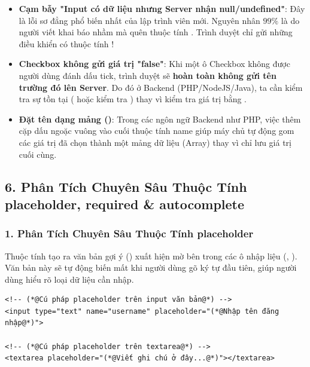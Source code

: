 \begin{tipBox}
\begin{itemize}[leftmargin=1.5em, itemsep=4pt, parsep=0pt]
    \item \textbf{Cạm bẫy "Input có dữ liệu nhưng Server nhận null/undefined"}: Đây là lỗi sơ đẳng phổ biến nhất của lập trình viên mới. Nguyên nhân $99\%$ là do người viết khai báo nhầm  mà quên thuộc tính . Trình duyệt chỉ gửi những điều khiển có thuộc tính !
    \item \textbf{Checkbox không gửi giá trị "false"}: Khi một ô Checkbox không được người dùng đánh dấu tick, trình duyệt sẽ \textbf{hoàn toàn không gửi tên trường đó lên Server}. Do đó ở Backend (PHP/NodeJS/Java), ta cần kiểm tra sự tồn tại ( hoặc kiểm tra ) thay vì kiểm tra giá trị bằng .
    \item \textbf{Đặt tên dạng mảng ()}: Trong các ngôn ngữ Backend như PHP, việc thêm cặp dấu ngoặc vuông \codeinline{[]} vào cuối thuộc tính name giúp máy chủ tự động gom các giá trị đã chọn thành một mảng dữ liệu (Array) thay vì chỉ lưu giá trị cuối cùng.
\end{itemize}
\end{tipBox}
\subsection{6. Phân Tích Chuyên Sâu Thuộc Tính placeholder, required \& autocomplete}

\subsubsection{1. Phân Tích Chuyên Sâu Thuộc Tính placeholder}

\begin{conceptBox}
Thuộc tính  tạo ra văn bản gợi ý () xuất hiện mờ bên trong các ô nhập liệu (, ). Văn bản này sẽ tự động biến mất khi người dùng gõ ký tự đầu tiên, giúp người dùng hiểu rõ loại dữ liệu cần nhập.
\end{conceptBox}

\begin{codeWindow}
\begin{lstlisting}[language=HTML5]
<!-- (*@Cú pháp placeholder trên input văn bản@*) -->
<input type="text" name="username" placeholder="(*@Nhập tên đăng nhập@*)">

<!-- (*@Cú pháp placeholder trên textarea@*) -->
<textarea placeholder="(*@Viết ghi chú ở đây...@*)"></textarea>
\end{lstlisting}
\end{codeWindow}

